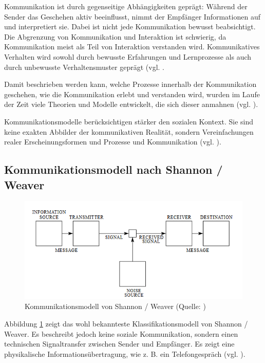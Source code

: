 Kommunikation ist durch gegenseitige Abhängigkeiten geprägt: Während der Sender das Geschehen aktiv beeinflusst, nimmt der Empfänger Informationen auf und interpretiert sie. Dabei ist nicht jede Kommunikation bewusst beabsichtigt. Die Abgrenzung von Kommunikation und Interaktion ist schwierig, da Kommunikation meist als Teil von Interaktion verstanden wird. Kommunikatives Verhalten wird sowohl durch bewusste Erfahrungen und Lernprozesse als auch durch unbewusste Verhaltensmuster geprägt (vgl. \cite[S. 20]{becker_praxishandbuch_2018}.

Damit beschrieben werden kann, welche Prozesse innerhalb der Kommunikation geschehen, wie die Kommunikation erlebt und verstanden wird, wurden im Laufe der Zeit viele Theorien und Modelle entwickelt, die sich dieser anmahnen (vgl. \cite[S. 311]{schwarz_grundlagen_2019}).

Kommunikationsmodelle berücksichtigen stärker den sozialen Kontext. Sie sind keine exakten Abbilder der kommunikativen Realität, sondern Vereinfachungen realer Erscheinungsformen und Prozesse und Kommunikation (vgl. \cite[S. 56]{maletzke_kommunikationswissenschaft_1998}).

\subsection{Kommunikationsmodell nach Shannon / Weaver}

\begin{figure}[ht]
\centering
\includegraphics[width=1\linewidth]{content/pictures/shannon-weaver.PNG}
\caption{Kommunikationsmodell von Shannon / Weaver (Quelle: \cite[S. 2]{shannon_mathematical_1948})}
\label{fig:shannon-weaver-modell}
\end{figure}

Abbildung \ref{fig:shannon-weaver-modell} zeigt das wohl bekannteste Klassifikationsmodell von Shannon / Weaver. Es beschreibt jedoch keine soziale Kommunikation, sondern einen technischen Signaltransfer zwischen Sender und Empfänger. Es zeigt eine physikalische Informationsübertragung, wie z. B. ein Telefongespräch (vgl. \cite[S. 92]{scheufele_kommunikationstheorien_2004}). 

